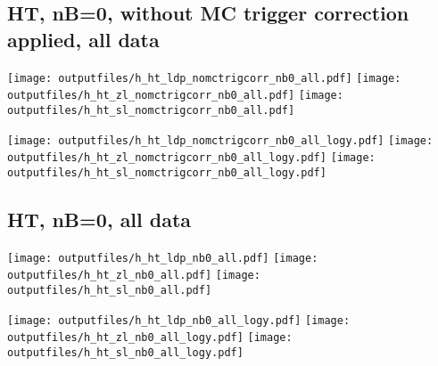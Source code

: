 \documentclass[11pt]{article}
\begin{document}
   \clearpage
    \subsection{ HT, nB=0, without MC trigger correction applied, all data}

    \noindent
    \texttt{[image: outputfiles/h\_ht\_ldp\_nomctrigcorr\_nb0\_all.pdf]}
    \texttt{[image: outputfiles/h\_ht\_zl\_nomctrigcorr\_nb0\_all.pdf]}
    \texttt{[image: outputfiles/h\_ht\_sl\_nomctrigcorr\_nb0\_all.pdf]}

    \noindent
    \texttt{[image: outputfiles/h\_ht\_ldp\_nomctrigcorr\_nb0\_all\_logy.pdf]}
    \texttt{[image: outputfiles/h\_ht\_zl\_nomctrigcorr\_nb0\_all\_logy.pdf]}
    \texttt{[image: outputfiles/h\_ht\_sl\_nomctrigcorr\_nb0\_all\_logy.pdf]}


    \subsection{ HT, nB=0, all data}

    \noindent
    \texttt{[image: outputfiles/h\_ht\_ldp\_nb0\_all.pdf]}
    \texttt{[image: outputfiles/h\_ht\_zl\_nb0\_all.pdf]}
    \texttt{[image: outputfiles/h\_ht\_sl\_nb0\_all.pdf]}

    \noindent
    \texttt{[image: outputfiles/h\_ht\_ldp\_nb0\_all\_logy.pdf]}
    \texttt{[image: outputfiles/h\_ht\_zl\_nb0\_all\_logy.pdf]}
    \texttt{[image: outputfiles/h\_ht\_sl\_nb0\_all\_logy.pdf]}






\end{document}
